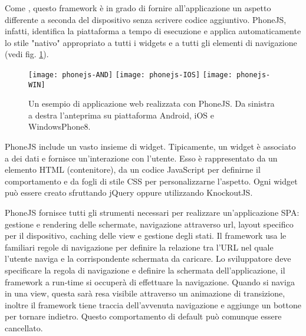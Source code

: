             Come \kendomob{}, questo frame\-work è in grado di fornire all'applicazione
            un aspetto differente a seconda del dispositivo senza scrivere codice aggiuntivo.
            PhoneJS, infatti, identifica la piattaforma a tempo di esecuzione
            e applica automaticamente
            lo stile "nativo" appropriato a tutti i widgets e a tutti gli elementi
            di navigazione (vedi fig. \ref{fig:phonejs}).

            \begin{figure}[h]
                \centering
                \texttt{[image: phonejs-AND]}
                \texttt{[image: phonejs-IOS]}
                \texttt{[image: phonejs-WIN]}
                \caption{
                    Un esempio di applicazione web realizzata con PhoneJS.
                    Da sinistra a destra l'anteprima su piattaforma Android, iOS
                    e WindowsPhone8.
                }
                \label{fig:phonejs}
            \end{figure}

            PhoneJS include un vasto insieme di widget. Tipicamente,
            un widget è associato a dei dati e fornisce un'interazione con l'utente.
            Esso è rappresentato da un elemento HTML (contenitore), da un codice
            JavaScript per definirne il comportamento e da fogli di stile CSS
            per personalizzarne l'aspetto.
            Ogni widget può essere creato sfruttando jQuery oppure utilizzando
            KnockoutJS.

            PhoneJS fornisce tutti gli strumenti necessari per realizzare un'applicazione
            SPA: gestione e rendering delle schermate, navigazione attraverso url,
            layout specifico per il dispositivo, caching delle view e gestione degli stati.
            Il frame\-work usa le familiari regole di navigazione per definire la
            relazione tra l'URL nel quale l'utente naviga e la corrispondente schermata
            da caricare. Lo sviluppatore deve specificare la regola di navigazione e definire
            la schermata dell'applicazione, il frame\-work a run-time si occuperà di effettuare la
            navigazione.
            Quando si naviga in una view, questa sarà resa visibile attraverso un
            animazione di transizione, inoltre il frame\-work tiene traccia dell'avvenuta
            navigazione e aggiunge un bottone per tornare indietro. Questo comportamento
            di default può comunque essere cancellato.


